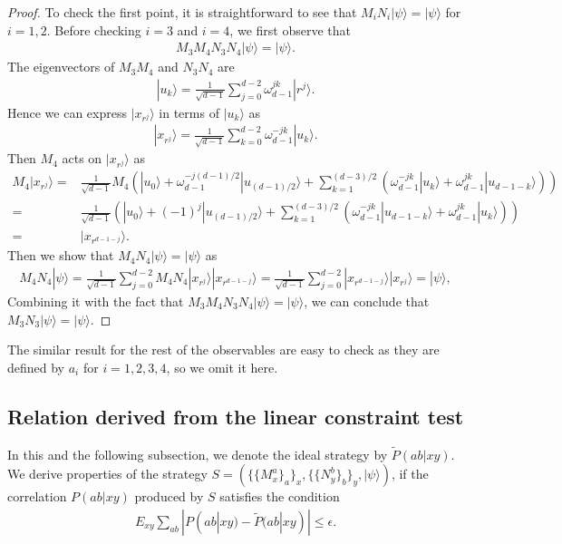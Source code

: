 \documentclass[11pt,letterpaper]{article}
\newcommand{\ket}[1]{|#1\rangle}
\newcommand{\1}{\mathbb{1}}
\newcommand{\pr}[2]{P(#1|#2)}
\newcommand{\tpr}[2]{\tilde{P}(#1|#2)}
\newcommand{\ep}{\epsilon}
\theoremstyle{definition}
\begin{document}
\begin{proof}
	To check the first point, it is straightforward to see that $M_iN_i \ket{\psi} = \ket{\psi}$ for $i = 1,2$.
	Before checking $i=3$ and $i=4$, we first observe that
	\begin{align}
		M_3M_4 N_3 N_4 \ket{\psi} = \ket{\psi}.
	\end{align}
	The eigenvectors of $M_3M_4$ and $N_3N_4$ are 
        \begin{align}
        		\ket{u_k} = \frac{1}{\sqrt{d-1}} \sum_{j=0}^{d-2} \omega_{d-1}^{jk} \ket{r^j}.
        \end{align}
        Hence we can express $\ket{x_{r^j}}$ in terms of $\ket{u_k}$ as 
        \begin{align}
        		\ket{x_{r^j}} = \frac{1}{\sqrt{d-1}} \sum_{k=0}^{d-2} \omega_{d-1}^{-jk} \ket{u_k}.
        \end{align}
        Then $M_4$ acts on $\ket{x_{r^j}}$ as 
        \begin{align}
        		M_4 \ket{x_{r^j}} =& \frac{1}{\sqrt{d-1}} M_4\left(\ket{u_0} + \omega_{d-1}^{-j(d-1)/2}\ket{u_{(d-1)/2}}  + 
        	\sum_{k=1}^{(d-3)/2} (\omega_{d-1}^{-jk} \ket{u_k} + \omega_{d-1}^{jk} \ket{u_{d-1-k}})\right) \\
        	=&\frac{1}{\sqrt{d-1}} \left(\ket{u_0} + (-1)^j\ket{u_{(d-1)/2}}  + 
        	\sum_{k=1}^{(d-3)/2} (\omega_{d-1}^{-jk} \ket{u_{d-1-k}} + \omega_{d-1}^{jk} \ket{u_{k}})\right) \\
        	=& \ket{x_{r^{d-1-j}}}.
        \end{align}
        Then we show that $M_4  N_4 \ket{\psi} = \ket{\psi}$ as 
        \begin{align}
        	M_4 N_4 \ket{\psi} = \frac{1}{\sqrt{d-1}}  \sum_{j=0}^{d-2} M_4  N_4 \ket{x_{r^j}} \ket{x_{r^{d-1-j}}} 
        	= \frac{1}{\sqrt{d-1}} \sum_{j=0}^{d-2} \ket{x_{r^{d-1-j}}} \ket{x_{r^{j}}} =\ket{\psi},
        \end{align}
	Combining it with the fact that $M_3M_4 N_3N_4 \ket{\psi} = \ket{\psi}$, we can conclude that
	$M_3N_3 \ket{\psi} = \ket{\psi}$.
\end{proof}
The similar result for the rest of the observables are easy to check as they are defined by $a_i$ for $i=1,2,3,4$, so we omit it here.
\subsection{Relation derived from the linear constraint test}
In this and the following subsection, we denote the ideal strategy by $\tpr{ab}{xy}$.
We derive properties of the strategy $S = ( \{\{M_x^a\}_a\}_x, \{\{N_y^b\}_b\}_y, \ket{\psi} )$,
if the correlation $\pr{ab}{xy}$ produced by $S$ satisfies the condition
\begin{align}
	E_{xy} \sum_{ab} |\pr{ab}{xy} - \tpr{ab}{xy}| \leq \ep.
\end{align}
\end{document}
